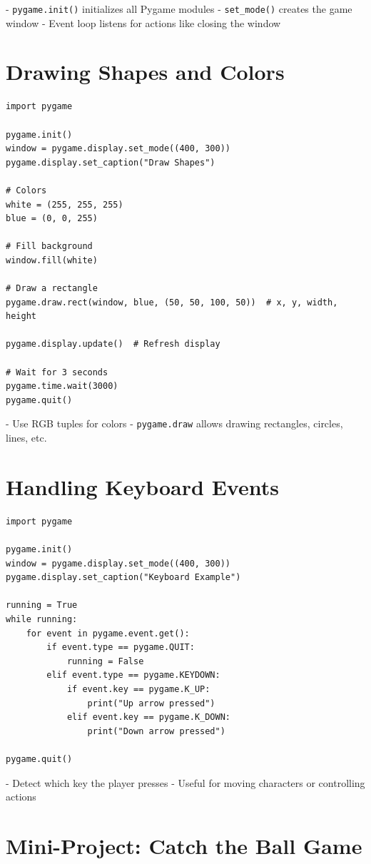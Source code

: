 - \texttt{pygame.init()} initializes all Pygame modules  
- \texttt{set\_mode()} creates the game window  
- Event loop listens for actions like closing the window  

\section{Drawing Shapes and Colors}

\begin{verbatim}
import pygame

pygame.init()
window = pygame.display.set_mode((400, 300))
pygame.display.set_caption("Draw Shapes")

# Colors
white = (255, 255, 255)
blue = (0, 0, 255)

# Fill background
window.fill(white)

# Draw a rectangle
pygame.draw.rect(window, blue, (50, 50, 100, 50))  # x, y, width, height

pygame.display.update()  # Refresh display

# Wait for 3 seconds
pygame.time.wait(3000)
pygame.quit()
\end{verbatim}

- Use RGB tuples for colors  
- \texttt{pygame.draw} allows drawing rectangles, circles, lines, etc.  

\section{Handling Keyboard Events}

\begin{verbatim}
import pygame

pygame.init()
window = pygame.display.set_mode((400, 300))
pygame.display.set_caption("Keyboard Example")

running = True
while running:
    for event in pygame.event.get():
        if event.type == pygame.QUIT:
            running = False
        elif event.type == pygame.KEYDOWN:
            if event.key == pygame.K_UP:
                print("Up arrow pressed")
            elif event.key == pygame.K_DOWN:
                print("Down arrow pressed")

pygame.quit()
\end{verbatim}

- Detect which key the player presses  
- Useful for moving characters or controlling actions  

\section{Mini-Project: Catch the Ball Game}

